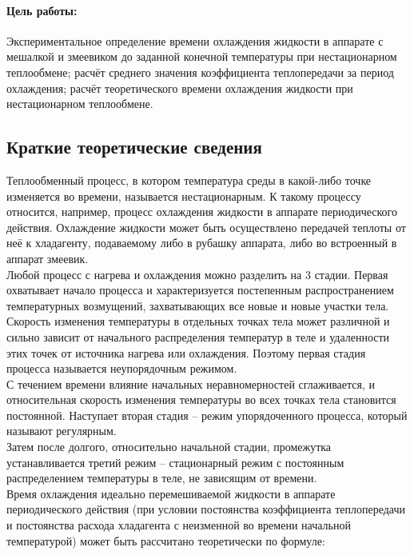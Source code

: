 \documentclass[12pt, a4paper]{article}
\begin{document}



\paragraph*{\bfseries {Цель работы:}}
Экспериментальное определение времени охлаждения
жидкости в аппарате с мешалкой и змеевиком до заданной конечной 
температуры при нестационарном теплообмене; расчёт среднего значения 
коэффициента теплопередачи за период охлаждения; расчёт теоретического
времени охлаждения жидкости при нестационарном теплообмене.

\begin{center}
\subsection*{Краткие теоретические сведения}
\end{center}
Теплообменный процесс, в котором температура среды в какой-либо точке изменяется во времени, называется нестационарным. К такому процессу относится, например, процесс охлаждения жидкости в аппарате периодического действия. Охлаждение жидкости может быть осуществлено передачей теплоты от неё к хладагенту, подаваемому либо в рубашку аппарата, либо во встроенный в аппарат змеевик.\\

Любой процесс с нагрева и охлаждения можно разделить на 3 стадии. Первая охватывает начало процесса и характеризуется постепенным распространением температурных возмущений, захватывающих все новые и новые участки тела. Скорость изменения температуры в отдельных точках тела может различной и сильно зависит от начального распределения температур в теле и удаленности этих точек от источника нагрева или охлаждения. Поэтому первая стадия процесса называется неупорядочным режимом.\\

С течением времени влияние начальных неравномерностей сглаживается, и относительная скорость изменения температуры во всех точках тела становится постоянной. Наступает вторая стадия – режим упорядоченного процесса, который называют регулярным.\\

Затем после долгого, относительно начальной стадии, промежутка устанавливается третий режим – стационарный режим с постоянным распределением температуры в теле, не зависящим от времени.\\

Время охлаждения идеально перемешиваемой жидкости в аппарате периодического действия (при условии постоянства коэффициента теплопередачи и постоянства расхода хладагента с неизменной во времени начальной температурой) может быть рассчитано теоретически по формуле:\\
\end{document}
